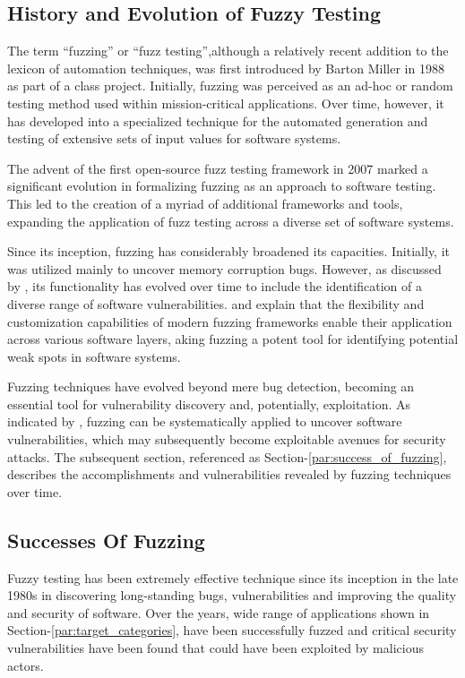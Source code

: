 \subsection{History and Evolution of Fuzzy Testing}
The term ``fuzzing'' or ``fuzz testing'',although a relatively recent addition
to the lexicon of automation techniques, was first introduced by Barton Miller
in 1988 as part of a class project\cite{takanen2009fuzzing}. Initially,
fuzzing was perceived as an ad-hoc or random testing method used within
mission-critical applications\cite{WhatisaM24:online}. Over time, however, it
has developed into a specialized technique for the automated generation and
testing of extensive sets of input values for software systems\cite{bohme2020fuzzing}.

The advent of the first open-source fuzz testing framework in 2007\cite{takanen2009fuzzing}
marked a significant evolution in formalizing fuzzing as an approach to software testing.
This led to the creation of a myriad of additional frameworks and tools, expanding the
application of fuzz testing across a diverse set of software systems.

Since its inception, fuzzing has considerably broadened its capacities.
Initially, it was utilized mainly to uncover memory corruption bugs. However,
as discussed by , its functionality has
evolved over time to include the identification of a diverse range of
software vulnerabilities\cite{bohme2020fuzzing}.  and 
explain that the flexibility and customization capabilities of modern fuzzing
frameworks enable their application across various software layers,
aking fuzzing a potent tool for identifying potential weak spots in
software systems\cite{takanen2009fuzzing}.

Fuzzing techniques have evolved beyond mere bug detection, becoming an essential
tool for vulnerability discovery and, potentially, exploitation.
As indicated by \citeauthor{beaman2022fuzzing}, fuzzing can be
systematically applied to uncover software vulnerabilities, which
may subsequently become exploitable avenues for security
attacks\cite{beaman2022fuzzing}. The subsequent section, referenced as
Section-\ref{par:success_of_fuzzing}, describes the accomplishments and
vulnerabilities revealed by fuzzing techniques over time.

\subsection{Successes Of Fuzzing}
Fuzzy testing has been extremely effective technique since its inception in the
late 1980s in discovering long-standing bugs, vulnerabilities and improving the
quality and security of software. Over the years, wide range of applications
shown in Section-\ref{par:target_categories}, have been successfully fuzzed
and critical security vulnerabilities have been found that could have been
exploited by malicious actors.\label{par:success_of_fuzzing}

